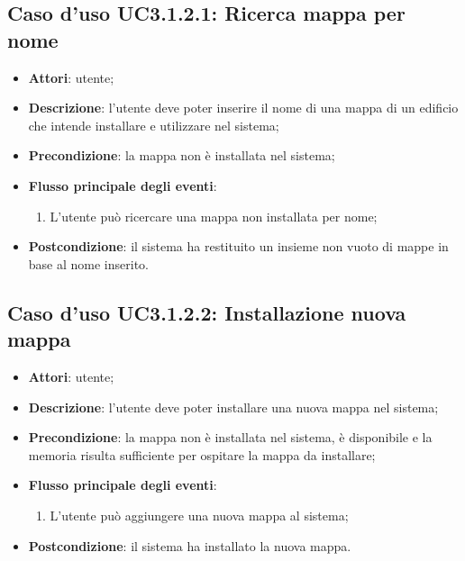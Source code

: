 \documentclass[../AnalisiDeiRequisiti.tex]{subfiles}
\begin{document}
\subsection{Caso d'uso UC3.1.2.1: Ricerca mappa per nome}
\begin{itemize}
\item \textbf{Attori}: utente;
\item \textbf{Descrizione}: l'utente deve poter inserire il nome di una mappa di un edificio che intende installare e utilizzare nel sistema; 
      \item \textbf{Precondizione}: la mappa non è installata nel sistema;

        \item \textbf{Flusso principale degli eventi}:
          \begin{enumerate}
          \item L'utente può ricercare una mappa non installata per nome;

      \end{enumerate}
    \item \textbf{Postcondizione}: il sistema ha restituito un insieme non vuoto di mappe in base al nome inserito.
  \end{itemize}
\hypertarget{UC3.1.2.2}{}
\subsection{Caso d'uso UC3.1.2.2: Installazione nuova mappa}
\begin{itemize}
\item \textbf{Attori}: utente;
\item \textbf{Descrizione}: l'utente deve poter installare una nuova mappa nel sistema; 
      \item \textbf{Precondizione}: la mappa non è installata nel sistema, è disponibile e la memoria risulta sufficiente per ospitare la mappa da installare;

        \item \textbf{Flusso principale degli eventi}:
          \begin{enumerate}
          \item L'utente può aggiungere una nuova mappa al sistema;

      \end{enumerate}
    \item \textbf{Postcondizione}: il sistema ha installato la nuova mappa.
  \end{itemize}
\hypertarget{UC3.1.2.3}{}
\end{document}
